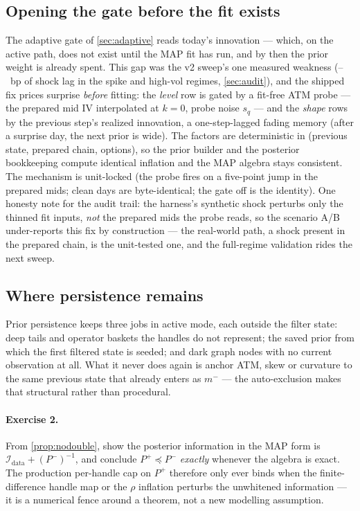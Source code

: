 \documentclass[11pt]{article}
\newcommand{\calI}{\mathcal I}
\begin{document}
\subsection{Opening the gate before the fit exists}
\label{sec:probegate}

The adaptive gate of \cref{sec:adaptive} reads today's innovation ---
which, on the active path, does not exist until the MAP fit has run,
and by then the prior weight is already spent.  This gap was the v2
sweep's one measured weakness (\ktractshockspike--\ktractshockhigh\ bp
of shock lag in the spike and high-vol regimes,
\cref{sec:audit}), and the shipped fix prices surprise \emph{before}
fitting: the \emph{level} row is gated by a fit-free ATM probe --- the
prepared mid IV interpolated at $k=0$, probe noise $s_q$ --- and the
\emph{shape} rows by the previous step's realized innovation, a
one-step-lagged fading memory (after a surprise day, the next prior is
wide).  The factors are deterministic in (previous state, prepared
chain, options), so the prior builder and the posterior bookkeeping
compute identical inflation and the MAP algebra stays consistent.  The
mechanism is unit-locked (the probe fires on a five-point jump in the
prepared mids; clean days are byte-identical; the gate off is the
identity).  One honesty note for the audit trail: the harness's
synthetic shock perturbs only the thinned fit inputs, \emph{not} the
prepared mids the probe reads, so the scenario A/B under-reports this
fix by construction --- the real-world path, a shock present in the
prepared chain, is the unit-tested one, and the full-regime validation
rides the next sweep.

\subsection{Where persistence remains}

Prior persistence keeps three jobs in active mode, each outside the
filter state: deep tails and operator baskets the handles do not
represent; the saved prior from which the first filtered state is
seeded; and dark graph nodes with no current observation at all.  What
it never does again is anchor ATM, skew or curvature to the same
previous state that already enters as $m^-$ --- the auto-exclusion
makes that structural rather than procedural.

\paragraph{Exercise 2.}
From \cref{prop:nodouble}, show the posterior information in the MAP
form is $\calI_{\mathrm{data}}+(P^-)^{-1}$, and conclude
$P^+\preceq P^-$ \emph{exactly} whenever the algebra is exact.  The
production per-handle cap on $P^+$ therefore only ever binds when the
finite-difference handle map or the $\rho$ inflation perturbs the
unwhitened information --- it is a numerical fence around a theorem,
not a new modelling assumption.
\end{document}
